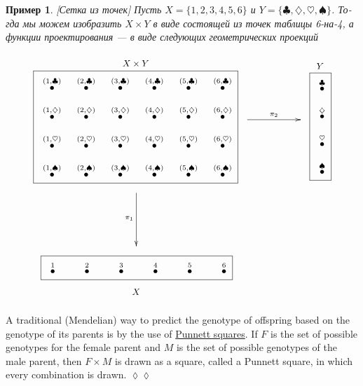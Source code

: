 \documentclass[a4paper]{book}
\newcommand{\LMO}[1]{\stackrel{#1}{\bullet}}
\theoremstyle{myth}
\newtheorem{appENG}[envENG]{\begin{english}Application\end{english}}
\newenvironment{applicationENG}{\begin{appENG}}{\hspace*{\fill}$\lozenge\lozenge$\end{appENG}}
\newtheorem{exampleRUS}[envRUS]{Пример}
\begin{document}
\begin{russian}
\begin{exampleRUS}\label{ex:grid1}[Сетка из точек]
Пусть $X=\{1,2,3,4,5,6\}$ и $Y=\{\clubsuit,\diamondsuit,\heartsuit,\spadesuit\}$. Тогда мы можем изобразить $X\times Y$ в виде состоящей из точек таблицы 6-на-4, а функции проектирования — в виде следующих геометрических проекций
\begin{align}
\parbox{2.9in}{\begin{center}\small $X\times Y$\vspace{-.1in}\end{center}\fbox{
\xymatrix@=10pt{
\LMO{(1,\clubsuit)}&\LMO{(2,\clubsuit)}&\LMO{(3,\clubsuit)}&\LMO{(4,\clubsuit)}&\LMO{(5,\clubsuit)}&\LMO{(6,\clubsuit)}\\
\LMO{(1,\diamondsuit)}&\LMO{(2,\diamondsuit)}&\LMO{(3,\diamondsuit)}&\LMO{(4,\diamondsuit)}&\LMO{(5,\diamondsuit)}&\LMO{(6,\diamondsuit)}\\
\LMO{(1,\heartsuit)}&\LMO{(2,\heartsuit)}&\LMO{(3,\heartsuit)}&\LMO{(4,\heartsuit)}&\LMO{(5,\heartsuit)}&\LMO{(6,\heartsuit)}\\
\LMO{(1,\spadesuit)}&\LMO{(2,\spadesuit)}&\LMO{(3,\spadesuit)}&\LMO{(4,\spadesuit)}&\LMO{(5,\spadesuit)}&\LMO{(6,\spadesuit)}\\
}}}
\parbox{.9in}{
\xymatrix{~\ar[rr]^{\pi_2}&&~}
}
\parbox{.3in}{\begin{center}\small $Y$\vspace{-.1in}\end{center}\fbox{
\xymatrix@=10pt{
\LMO{\clubsuit}\\\LMO{\diamondsuit}\\\LMO{\heartsuit}\\\LMO{\spadesuit}
}}}
\\\nonumber
\parbox{1in}{\hspace{-1.95in}\xymatrix{~\ar[dd]_{\pi_1}\\\\~}}
\\\nonumber
\parbox{2.9in}{\hspace{-1.2in}\fbox{
\xymatrix@=24pt{
\LMO{1}&\LMO{2}&\LMO{3}&\LMO{4}&\LMO{5}&\LMO{6}
}}\begin{center}\hspace{-2.6in}\small$X$\end{center}}
\end{align}
\end{exampleRUS}

\begin{applicationENG}
A traditional (Mendelian) way to predict the genotype of offspring based on the genotype of its parents is by the use of \href{http://en.wikipedia.org/wiki/Punnett_square}{Punnett squares}. If $F$ is the set of possible genotypes for the female parent and $M$ is the set of possible genotypes of the male parent, then $F\times M$ is drawn as a square, called a Punnett square, in which every combination is drawn. 
\end{applicationENG}


\end{russian}
\end{document}
